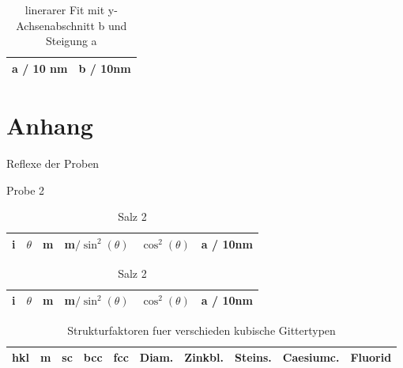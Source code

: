 \begin{table}[ht]
		\centering
		\caption{linerarer Fit mit y-Achsenabschnitt b und Steigung a}
		\label{tab:gitt}
		\begin{tabular}{c c}
				\toprule
				a / 10 nm & b / 10nm \\
				\midrule
				
				
				\bottomrule
		\end{tabular}
\end{table}

\section{Anhang}\label{sec:Anhang}

\begin{table}[ht]
		\centering
		\caption{Reflexe der Proben}
		\label{tab:label}
		\begin{subtable}{0.9\textwidth}
				\centering
				\caption{Probe 2}
				\begin{tabular}{c c c c c c}
						\toprule
						i & $\theta$ & m & m$/\sin^2(\theta)$ & $\cos^2(\theta)$ & a / 10nm \\ \midrule
						
						\bottomrule
				\end{tabular}
		\end{subtable}
		\begin{subtable}{0.9\textwidth}
				\centering
				\caption{Salz 2}
				\begin{tabular}{c c c c c c}
						\toprule
						i & $\theta$ & m & m$/\sin^2(\theta)$ & $\cos^2(\theta)$ & a / 10nm \\ 
						\midrule
						
						\bottomrule
				\end{tabular}
		\end{subtable}
\end{table}

\begin{table}[ht]
		\centering
		\caption{Strukturfaktoren fuer verschieden kubische Gittertypen}
		\label{tab:label}
		\begin{tabular}{c c c c c c c c c c}
				\toprule
				hkl & m & sc & bcc & fcc & Diam. & Zinkbl. & Steins. & Caesiumc. & Fluorid \\ 
				\midrule
					
				\bottomrule
		\end{tabular}
\end{table}

